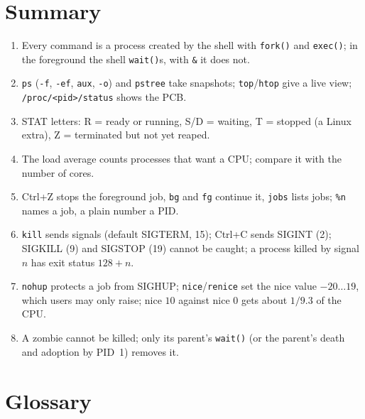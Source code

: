\documentclass[11pt,a4paper]{article}
\newcommand{\cmd}[1]{\texttt{#1}}
\begin{document}
\section{Summary}

\begin{keyidea}
\begin{enumerate}[leftmargin=1.4em]
  \item Every command is a process created by the shell with \cmd{fork()} and \cmd{exec()}; in the foreground the shell \cmd{wait()}s, with \texttt{\&} it does not.
  \item \cmd{ps} (\cmd{-f}, \cmd{-ef}, \cmd{aux}, \cmd{-o}) and \cmd{pstree} take snapshots; \cmd{top}/\cmd{htop} give a live view; \texttt{/proc/<pid>/status} shows the PCB.
  \item STAT letters: R = ready or running, S/D = waiting, T = stopped (a Linux extra), Z = terminated but not yet reaped.
  \item The load average counts processes that want a CPU; compare it with the number of cores.
  \item Ctrl+Z stops the foreground job, \cmd{bg} and \cmd{fg} continue it, \cmd{jobs} lists jobs; \texttt{\%n} names a job, a plain number a PID.
  \item \cmd{kill} sends signals (default SIGTERM, 15); Ctrl+C sends SIGINT (2); SIGKILL (9) and SIGSTOP (19) cannot be caught; a process killed by signal $n$ has exit status $128 + n$.
  \item \cmd{nohup} protects a job from SIGHUP; \cmd{nice}/\cmd{renice} set the nice value $-20 \dots 19$, which users may only raise; nice $10$ against nice $0$ gets about $1/9.3$ of the CPU.
  \item A zombie cannot be killed; only its parent's \cmd{wait()} (or the parent's death and adoption by PID~1) removes it.
\end{enumerate}
\end{keyidea}

\section{Glossary}
\end{document}
